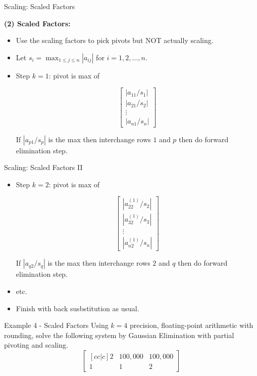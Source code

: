 \documentclass[12pt]{beamer}
\begin{document}
\begin{frame}{Scaling: Scaled Factors}

{\bf (2) Scaled Factors:}
\begin{itemize}
\item{Use the scaling factors to pick pivots but NOT actually scaling.}
\item{Let $s_i = \max_{1 \leq j \leq n} |a_{ij}|$ for $i=1,2,\dots, n$.}
\item{Step $k=1$: pivot is max of

\[
\begin{bmatrix}
  |a_{11}/s_1| \\
  |a_{21}/s_2| \\
  \vdots \\
  |a_{n1}/s_n| 
\end{bmatrix}
\]

If $|a_{p1}/s_p|$ is the max then interchange rows $1$ and $p$ then do forward elimination step.}

\end{itemize}
\end{frame}

\begin{frame}{Scaling: Scaled Factors II}

\begin{itemize}
\item{Step $k=2$: pivot is max of

\[
\begin{bmatrix}
  |a_{22}^{(1)}/s_2| \\
  |a_{32}^{(1)}/s_3| \\
  \vdots \\
  |a_{n2}^{(1)}/s_n| 
\end{bmatrix}
\]

If $|a_{q2}/s_q|$ is the max then interchange rows $2$ and $q$ then do forward elimination step.}
\item{etc.}
\item{Finish with back susbstitution as usual.}
\end{itemize}

\end{frame}


\begin{frame}{Example 4 - Scaled Factors}
Using $k=4$ precision, floating-point arithmetic with rounding, solve the following system by Gaussian Elimination with partial pivoting and scaling.
\[
\begin{bmatrix}[cc|c]
  2  &  100,000 & 100,000 \\
  1  &  1  &  2
\end{bmatrix}
\]
\vspace{2 in}

\end{frame}
\end{document}
